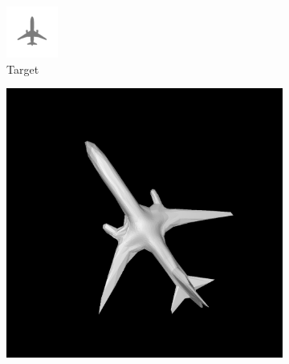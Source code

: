 \documentclass{article}
\begin{document}
\begin{figure}[h!]
  \centering
  \begin{subfigure}{.3\textwidth}
    \centering
    \includegraphics[width=\textwidth]{images/airplanepng.png}
    \caption{Target}
    \label{results-plane-mesh1}
  \end{subfigure}
  \hfill
  \begin{subfigure}{.3\textwidth}
    \centering
    \includegraphics[width=\textwidth]{images/planemesh_a.png}

\end{subfigure}
\end{figure}
\end{document}
